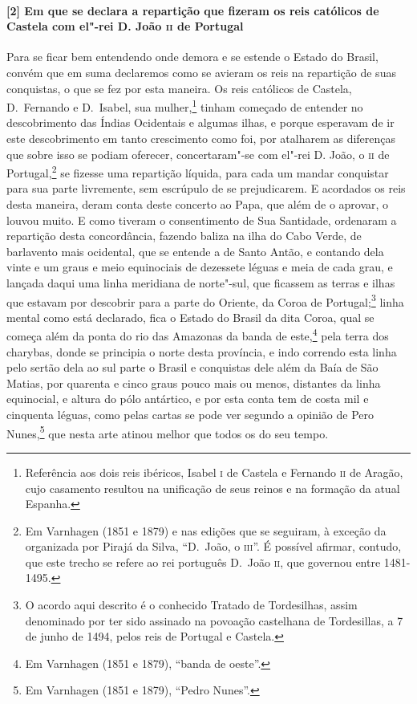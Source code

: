 \begin{linenumbers}
\paragraph{[2] Em que se declara a repartição que fizeram os reis católicos de Castela com
el"-rei D. João \textsc{ii} de Portugal} \quad
Para se ficar bem entendendo onde demora e se estende o Estado do Brasil, convém que em
suma declaremos como se avieram os reis na repartição de suas conquistas, o que se fez por
esta maneira. Os reis católicos de Castela, D.~Fernando e D.~Isabel, sua mulher,\footnote{
Referência aos dois reis ibéricos, Isabel \textsc{i} de Castela e Fernando \textsc{ii} de
Aragão, cujo casamento resultou na unificação de seus reinos e na formação da atual
Espanha.} tinham começado de entender no descobrimento das Índias Ocidentais e algumas
ilhas, e porque esperavam de ir este descobrimento em tanto crescimento como foi, por
atalharem as diferenças que sobre isso se podiam oferecer, concertaram"-se com el"-rei D.
João, o \textsc{ii} de Portugal,\footnote{ Em Varnhagen (1851 e 1879) e nas edições que se
seguiram, à exceção da organizada por Pirajá da Silva, ``D.~João, o \textsc{iii}''. É
possível afirmar, contudo, que este trecho se refere ao rei português D.~João \textsc{ii},
que governou entre 1481-1495.} se fizesse uma repartição líquida, para cada um mandar
conquistar para sua parte livremente, sem escrúpulo de se prejudicarem. E acordados os
reis desta maneira, deram conta deste concerto ao Papa, que além de o aprovar, o louvou
muito. E como tiveram o consentimento de Sua Santidade, ordenaram a repartição desta
concordância, fazendo baliza na ilha do Cabo Verde, de barlavento mais ocidental, que se
entende a de Santo Antão, e contando dela vinte e um graus e meio equinociais de dezessete
léguas e meia de cada grau, e lançada daqui uma linha meridiana de norte"-sul, que ficassem
as terras e ilhas que estavam por descobrir para a parte do Oriente, da Coroa de
Portugal;\footnote{ O acordo aqui descrito é o conhecido Tratado de Tordesilhas, assim
denominado por ter sido assinado na povoação castelhana de Tordesillas, a 7 de junho de
1494, pelos reis de Portugal e Castela.} linha mental como está declarado, fica o Estado
do Brasil da dita Coroa, qual se começa além da ponta do rio das Amazonas da banda de
este,\footnote{ Em Varnhagen (1851 e 1879), ``banda de oeste''.} pela terra dos charybas, donde se principia o norte desta província, e indo
correndo esta linha pelo sertão dela ao sul parte o Brasil e conquistas dele além da Baía
de São Matias, por quarenta e cinco graus pouco mais ou menos, distantes da linha
equinocial, e altura do pólo antártico, e por esta conta tem de costa mil e cinquenta
léguas, como pelas cartas se pode ver segundo a opinião de Pero Nunes,\footnote{ Em
Varnhagen (1851 e 1879), ``Pedro Nunes''.} que nesta arte atinou melhor que todos os do
seu tempo.


\end{linenumbers}
